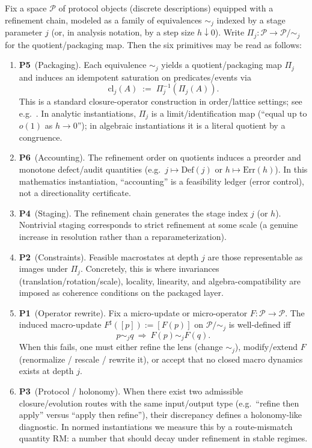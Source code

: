\documentclass[apajournal,article,submit,moreauthors,pdftex]{Definitions/mdpi}
\newenvironment{remark}{\begin{Remark}}{\end{Remark}}
\newcommand{\Pone}{\textbf{P1}}
\newcommand{\Ptwo}{\textbf{P2}}
\newcommand{\Pthree}{\textbf{P3}}
\newcommand{\Pfour}{\textbf{P4}}
\newcommand{\Pfive}{\textbf{P5}}
\newcommand{\Psix}{\textbf{P6}}
\begin{document}
\begin{remark}[Six primitives (P1--P6), in framework language]\label{rem:six-primitives}
Fix a space $\mathcal P$ of protocol objects (discrete descriptions) equipped with a refinement chain, modeled as a family of equivalences $\sim_j$ indexed by a stage parameter $j$ (or, in analysis notation, by a step size $h\downarrow 0$).
Write $\Pi_j:\mathcal P\to \mathcal P/\!\sim_j$ for the quotient/packaging map.
Then the six primitives may be read as follows:
\begin{enumerate}
  \item \Pfive\ (Packaging). Each equivalence $\sim_j$ yields a quotient/packaging map $\Pi_j$ and induces an idempotent saturation on predicates/events via
  \[
    \mathrm{cl}_j(A)\;:=\;\Pi_j^{-1}(\Pi_j(A)).
  \]
  This is a standard closure-operator construction in order/lattice settings; see e.g.\ \cite{DaveyPriestley2002}.
  In analytic instantiations, $\Pi_j$ is a limit/identification map (``equal up to $o(1)$ as $h\to 0$''); in algebraic instantiations it is a literal quotient by a congruence.

  \item \Psix\ (Accounting). The refinement order on quotients induces a preorder and monotone defect/audit quantities (e.g.\ $j\mapsto \mathrm{Def}(j)$ or $h\mapsto \mathrm{Err}(h)$).
  In this mathematics instantiation, ``accounting'' is a feasibility ledger (error control), not a directionality certificate.

  \item \Pfour\ (Staging). The refinement chain generates the stage index $j$ (or $h$).
  Nontrivial staging corresponds to strict refinement at some scale (a genuine increase in resolution rather than a reparameterization).

  \item \Ptwo\ (Constraints). Feasible macrostates at depth $j$ are those representable as images under $\Pi_j$.
  Concretely, this is where invariances (translation/rotation/scale), locality, linearity, and algebra-compatibility are imposed as coherence conditions on the packaged layer.

  \item \Pone\ (Operator rewrite). Fix a micro-update or micro-operator $F:\mathcal P\to\mathcal P$.
  The induced macro-update $F^\sharp([p]) := [F(p)]$ on $\mathcal P/\!\sim_j$ is well-defined iff
  \[
    p\sim_j q \ \Rightarrow\ F(p)\sim_j F(q).
  \]
  When this fails, one must either refine the lens (change $\sim_j$), modify/extend $F$ (renormalize / rescale / rewrite it), or accept that no closed macro dynamics exists at depth $j$.

  \item \Pthree\ (Protocol / holonomy). When there exist two admissible closure/evolution routes with the same input/output type (e.g.\ ``refine then apply'' versus ``apply then refine''), their discrepancy defines a holonomy-like diagnostic.
  In normed instantiations we measure this by a route-mismatch quantity $\mathrm{RM}$: a number that should decay under refinement in stable regimes.
\end{enumerate}
\end{remark}
\end{document}
